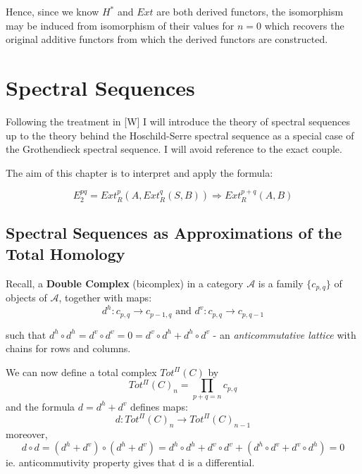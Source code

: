 Hence, since we know $H^*$ and $Ext$ are both derived functors,
the isomorphism may be induced from isomorphism of their values
for $n=0$ which recovers the original additive functors from which
the derived functors are constructed.



\section{Spectral Sequences}\label{df4.5} Following the treatment
in [W] I will introduce the theory of spectral sequences up to the
theory behind the Hoschild-Serre spectral sequence as a special
case of the Grothendieck spectral sequence. I will avoid reference
to the exact couple.

The aim of this chapter is to interpret and apply the formula:

$$E_2^{pq} = Ext_R^p (A,Ext_R^q(S,B)) \Longrightarrow Ext^{p+q}_R
(A,B)$$

\subsection{Spectral Sequences as Approximations of the Total
Homology}\label{df4.5.1}

Recall, a \textbf{Double Complex} (bicomplex) in a category
$\mathcal A$ is a family $\{c_{p,q}\}$ of objects of $\mathcal A$,
together with maps:
$$d^h:c_{p,q}\rightarrow c_{p-1,q} \text{ and }
d^v:c_{p,q}\rightarrow c_{p,q-1}$$

such that $d^h\circ d^h = d^v\circ d^v = 0 = d^v \circ d^h +
d^h\circ d^v$ - an \emph{anticommutative lattice} with chains for rows
and columns.

We can now define a total complex $Tot^\Pi (C)$ by
$$Tot^\Pi (C)_n = \prod_{p+q = n} c_{p,q}$$ and the formula
$d=d^h +d^v$ defines maps:
$$d: Tot^\Pi (C)_n\rightarrow Tot^\Pi (C)_{n-1}$$
moreover,
$$d\circ d = (d^h+d^v)\circ (d^h+d^v) = d^h\circ d^h + d^v\circ
d^v +(d^h\circ d^v +d^v\circ d^h ) = 0$$ ie. anticommutivity
property gives that d is a differential.

